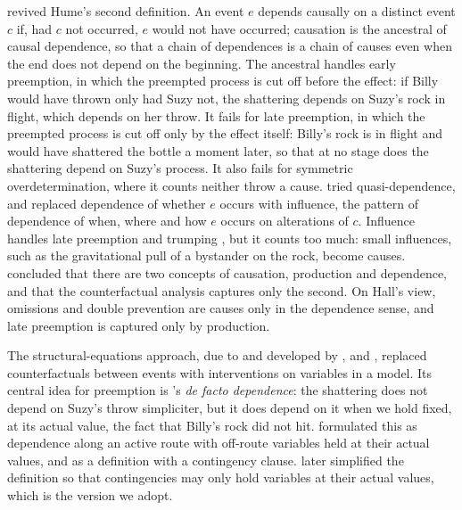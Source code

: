 \documentclass{situationist-preprint}
\begin{document}
\citet{Lewis1973} revived Hume's second definition. An event $e$ depends causally on a distinct event $c$ if, had $c$ not occurred, $e$ would not have occurred; causation is the ancestral of causal dependence, so that a chain of dependences is a chain of causes even when the end does not depend on the beginning. The ancestral handles early preemption, in which the preempted process is cut off before the effect: if Billy would have thrown only had Suzy not, the shattering depends on Suzy's rock in flight, which depends on her throw. It fails for late preemption, in which the preempted process is cut off only by the effect itself: Billy's rock is in flight and would have shattered the bottle a moment later, so that at no stage does the shattering depend on Suzy's process. It also fails for symmetric overdetermination, where it counts neither throw a cause. \citet{Lewis1986Postscripts} tried quasi-dependence, and \citet{Lewis2000} replaced dependence of whether $e$ occurs with influence, the pattern of dependence of when, where and how $e$ occurs on alterations of $c$. Influence handles late preemption and trumping \citep{Schaffer2000}, but it counts too much: small influences, such as the gravitational pull of a bystander on the rock, become causes. \citet{Hall2004} concluded that there are two concepts of causation, production and dependence, and that the counterfactual analysis captures only the second. On Hall's view, omissions and double prevention are causes only in the dependence sense, and late preemption is captured only by production.

The structural-equations approach, due to \citet{Pearl2000} and developed by \citet{Hitchcock2001}, \citet{Woodward2003} and \citet{HalpernPearl2005}, replaced counterfactuals between events with interventions on variables in a model. Its central idea for preemption is \citet{Yablo2002}'s \emph{de facto dependence}: the shattering does not depend on Suzy's throw simpliciter, but it does depend on it when we hold fixed, at its actual value, the fact that Billy's rock did not hit. \citet{Hitchcock2001} formulated this as dependence along an active route with off-route variables held at their actual values, and \citet{HalpernPearl2005} as a definition with a contingency clause. \citet{Halpern2015} later simplified the definition so that contingencies may only hold variables at their actual values, which is the version we adopt.
\end{document}
